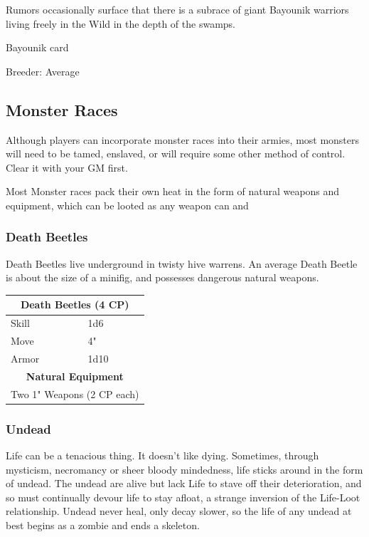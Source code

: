 \documentclass[12pt,a4paper,twocolumn]{article}
\begin{document}
Rumors occasionally surface that there is a subrace of giant Bayounik warriors living freely in the Wild in the depth of the swamps. 

Bayounik card

Breeder: Average

\subsection{Monster Races}

Although players can incorporate monster races into their armies, most monsters will need to be tamed, enslaved, or will require some other method of control.  Clear it with your GM first.

Most Monster races pack their own heat in the form of natural weapons and equipment, which can be looted as any weapon can and 

\subsubsection{Death Beetles}

Death Beetles live underground in twisty hive warrens.  An average Death Beetle is about the size of a minifig, and possesses dangerous natural weapons.

\begin{tabular}{|l|l|}
\multicolumn{2}{c}{\bf Death Beetles (4 CP) } \\ \hline
Skill & 1d6 \\ \hline
Move & 4" \\ \hline
Armor & 1d10 \\ \hline

\multicolumn{2}{c}{\bf Natural Equipment } \\ \hline
\multicolumn{2}{c}{ Two 1" Weapons (2 CP each) } \\ \hline
\end{tabular}

\subsubsection{Undead}

Life can be a tenacious thing.  It doesn't like dying.  Sometimes, through mysticism, necromancy or sheer bloody mindedness, life sticks around in the form of undead.  The undead are alive but lack Life to stave off their deterioration, and so must continually devour life to stay afloat, a strange inversion of the Life-Loot relationship.  Undead never heal, only decay slower, so the life of any undead at best begins as a zombie and ends a skeleton.
\end{document}
